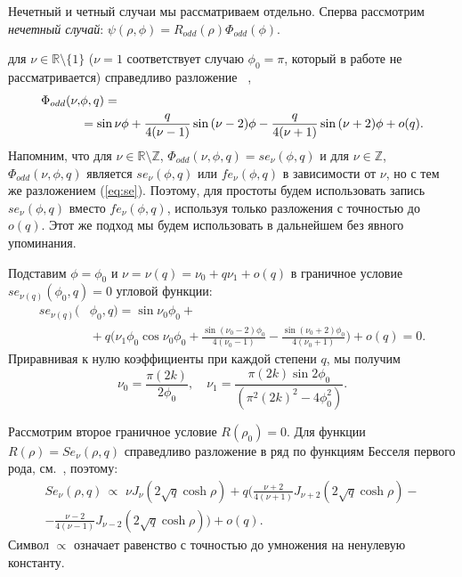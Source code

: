 Нечетный и четный случаи мы рассматриваем отдельно. Сперва рассмотрим
\textit{нечетный случай}: $\psi(\rho,\phi) = R_{odd}(\rho)\Phi_{odd}(\phi)  $.

для $\nu \in \mathbb{R} \setminus \{1\}$ 
($\nu=1$ соответствует случаю  $\phi_0=\pi$, который в работе не рассматривается)
справедливо разложение ~\cite[\S 2.2]{wref12},
\begin{align}
\Phi_{odd}(\nu, &{} \phi, q)  = \notag\\
	&{} = \sin{\nu\phi} + 
	\frac{q}{4(\nu-1)} \sin{(\nu-2)\phi} -\frac{q}{4(\nu+1)} \sin{(\nu+2)\phi} + o(q). \label{eq:se}
\end{align}
Напомним, что для $\nu \in \mathbb{R} \setminus \mathbb{Z}$, $\Phi_{odd}(\nu, \phi, q) = se_\nu(\phi, q)$ и для  $\nu \in  \mathbb{Z}$, $\Phi_{odd}(\nu, \phi, q)$ является $se_\nu(\phi, q) $ или $fe_\nu(\phi, q)$ в зависимости от $\nu$, но с тем же разложением (\ref{eq:se}). 
Поэтому, для простоты будем использовать запись $se_\nu(\phi, q)$ вместо $fe_\nu(\phi, q)$, используя только разложения с точностью до $o(q)$. Этот же подход мы будем использовать в дальнейшем без явного упоминания.

Подставим  $\phi=\phi_0$ и $\nu=\nu(q) = \nu_0 + q \nu_1 + o(q)$
в граничное условие $se_{\nu(q)}(\phi_0, q)=0$ угловой функции:
 \begin{align*}
 se_{\nu(q)}(& \phi_0, q) =  \sin \nu_0 \phi_0 + \\
&{} + q \biggl( \nu_1 \phi_0 \cos \nu_0 \phi_0 + \frac{\sin(\nu_0-2)\phi_0}{4(\nu_0-1)}  -\frac{\sin(\nu_0+2)\phi_0}{4(\nu_0+1)} \biggr) + o(q) =0.
\end{align*}
Приравнивая к нулю коэффициенты при каждой степени  $q$, мы получим
\begin{equation*}
\nu_0 = \frac{\pi (2k)}{2\phi_0}, \quad \nu_1 = \frac{\pi (2k) \sin 2 \phi_0}{(\pi^2 (2k)^2 - 4\phi_0^2)}.
\end{equation*}

Рассмотрим второе граничное условие $R(\rho_0) = 0$. 
Для функции  $R(\rho)=Se_\nu(\rho, q)$
справедливо разложение в ряд по функциям Бесселя первого рода, см.~\cite[гл. VIII]{mclachlan}, поэтому:
\begin{multline*}
Se_\nu(\rho, q) \,\propto\,\,  \nu J_\nu(2\sqrt{q} \cosh{\rho})  
+q \bigl( \frac{\nu + 2}{4(\nu+1)} J_{\nu+2}(2\sqrt{q} \cosh{\rho}) - \\
- \frac{\nu - 2}{4(\nu-1)} J_{\nu-2}(2\sqrt{q} \cosh{\rho}) \bigr) + o(q).
\end{multline*}
Символ $\propto$ означает равенство с точностью до умножения на ненулевую константу.

